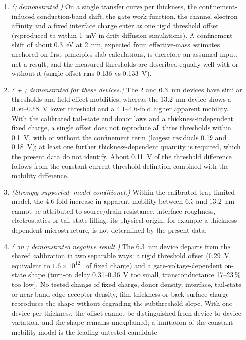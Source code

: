 \begin{enumerate}
  \item \emph{(\evNUM; demonstrated.)} On a single transfer curve per thickness, the confinement-induced conduction-band shift, the gate work function, the channel electron affinity and a fixed interface charge enter as one rigid threshold offset (reproduced to within 1~mV in drift-diffusion simulations). A confinement shift of about 0.3~eV at 2~nm, expected from effective-mass estimates anchored on first-principles slab calculations, is therefore an assumed input, not a result, and the measured thresholds are described equally well with or without it (single-offset rms 0.136 vs 0.133~V).
  \item \emph{(\evDATA{} + \evNUM; demonstrated for these devices.)} The 2 and 6.3~nm devices have similar thresholds and field-effect mobilities, whereas the 13.2~nm device shows a 0.56--0.58~V lower threshold and a 4.1--4.6-fold higher apparent mobility. With the calibrated tail-state and donor laws and a thickness-independent fixed charge, a single offset does not reproduce all three thresholds within 0.1~V, with or without the confinement term (largest residuals 0.19 and 0.18~V); at least one further thickness-dependent quantity is required, which the present data do not identify. About 0.11~V of the threshold difference follows from the constant-current threshold definition combined with the mobility difference.
  \item \emph{(Strongly supported; model-conditional.)} Within the calibrated trap-limited model, the 4.6-fold increase in apparent mobility between 6.3 and 13.2~nm cannot be attributed to source/drain resistance, interface roughness, electrostatics or tail-state filling; its physical origin, for example a thickness-dependent microstructure, is not determined by the present data.
  \item \emph{(\evNUM{} on \evDATA; demonstrated negative result.)} The 6.3~nm device departs from the shared calibration in two separable ways: a rigid threshold offset (0.29~V, equivalent to $1.6\times10^{12}$~\cmsq{} of fixed charge) and a gate-voltage-dependent on-state shape (turn-on delay 0.31--0.36~V too small, transconductance 17--23\,\% too low). No tested change of fixed charge, donor density, interface, tail-state or near-band-edge acceptor density, film thickness or back-surface charge reproduces the shape without degrading the subthreshold slope. With one device per thickness, the offset cannot be distinguished from device-to-device variation, and the shape remains unexplained; a limitation of the constant-mobility model is the leading untested candidate.
\end{enumerate}


